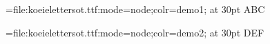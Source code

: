 \documentclass{article}
\begin{document}
\font\cow={file:koeielettersot.ttf:mode=node;colr=demo1;} at 30pt
    \cow ABC

\font\cow={file:koeielettersot.ttf:mode=node;colr=demo2;} at 30pt
    \cow DEF
\end{document}
